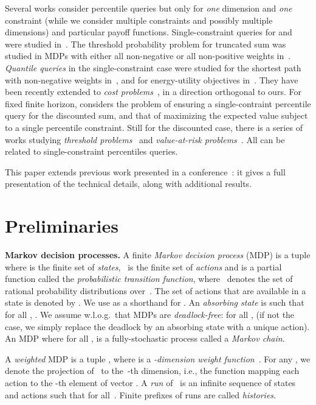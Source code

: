 \documentclass{llncs}
\begin{document}
Several works consider percentile queries but only for \textit{one} dimension and {\em one} constraint (while we consider multiple constraints and possibly multiple dimensions) and particular payoff functions. Single-constraint queries for  and  were studied in~\cite{CH-ilc09}. 
The threshold probability problem for truncated sum was studied in MDPs with either all non-negative or all non-positive weights in~\cite{Ohtsubo-amc2004,SO-jcta13}. \textit{Quantile queries} in the single-constraint case were studied for
the shortest path with non-negative weights 
in~\cite{DBLP:conf/fossacs/UmmelsB13}, and for
energy-utility objectives in~\cite{BDDKK-fm14}. They have been recently extended to \textit{cost problems}~\cite{HaaseK14}, in a direction orthogonal to ours. For fixed finite horizon, \cite{XM-ijcai11} considers the problem of ensuring a single-contraint percentile query for the discounted sum, and that of maximizing the expected value subject to a single percentile constraint. Still for the discounted case, there is a series of works studying \textit{threshold problems}~\cite{White1993634,WL99} and \textit{value-at-risk problems}~\cite{DBLP:conf/fsttcs/BrazdilCFNS13}. All can be related to single-constraint percentiles queries.

This paper extends previous work presented in a conference~\cite{RRS-cav15}: it gives a full presentation of the technical details, along with additional results.
 
\section{Preliminaries}

\smallskip\noindent\textbf{Markov decision processes.} A finite \textit{Markov decision process} (MDP) is a tuple  where
 is the finite set of \emph{states}, ~is the finite set of \emph{actions} and 
is a partial function called the \emph{probabilistic transition function}, where~ denotes the set of rational probability distributions over~.
The set of actions that are available in a state  is denoted by . 
We use  as a shorthand for .
An \emph{absorbing state}  is such that for all , . We assume w.l.o.g.~that MDPs are \textit{deadlock-free}: for all ,  (if not the case, we simply replace the deadlock by an absorbing state with a unique action). An MDP where for all ,  is a fully-stochastic process called a \textit{Markov chain}.

A \textit{weighted} MDP is a tuple , where  is a \emph{-dimension weight function}~.
For any , we denote  
the projection of~ to the~-th dimension, i.e., the function mapping each action  to the -th element of vector .
A \emph{run} of~ is an infinite sequence  of
states and actions such that  for all~.
Finite prefixes of runs are called \emph{histories}.
\end{document}
